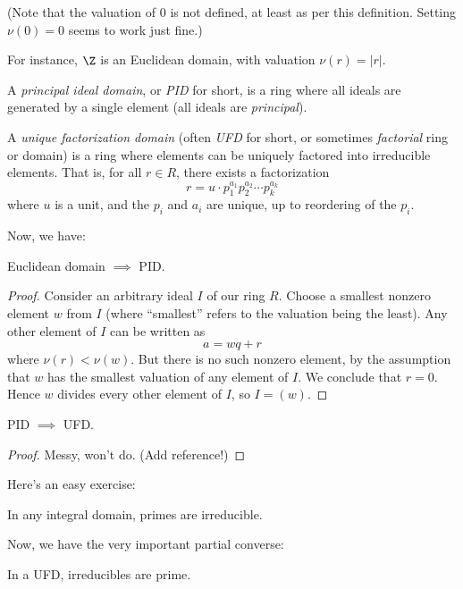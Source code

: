 \documentclass{scrbook}
\begin{document}
(Note that the valuation of $0$ is not defined, at least as per this definition.
Setting $\nu(0)=0$ seems to work just fine.)

For instance, $\Z$ is an Euclidean domain, with valuation $\nu(r) = |r|$.

\begin{defn}
 A \textit{principal ideal domain}, or \textit{PID} for short, is a ring where
 all ideals are generated by a single element (all ideals are \textit{principal}).
\end{defn}

\begin{defn}
  A \textit{unique factorization domain} (often \textit{UFD} for short, or sometimes
  \textit{factorial} ring or domain) is a ring where elements can be uniquely
  factored into irreducible elements. That is, for all $r\in R$, there exists a
  factorization
  $$r=u\cdot p_1^{a_1}p_2^{a_2}\cdots p_k^{a_k}$$
  where $u$ is a unit, and the $p_i$ and $a_i$ are unique, up to reordering of
  the $p_i$.
\end{defn}

Now, we have:
\begin{fact}
 Euclidean domain $\implies$ PID.
\end{fact}
\begin{proof}
  Consider an arbitrary ideal $I$ of our ring $R$. Choose a smallest nonzero
  element $w$ from
 $I$ (where ``smallest'' refers to the valuation being the least).
 Any other element of $I$ can be written as
 $$a = wq + r$$
 where $\nu(r) < \nu(w)$. But there is no such nonzero element, by the
 assumption that $w$ has the smallest valuation of any element of $I$. We
 conclude that $r=0$.
 Hence $w$ divides every other element of $I$, so $I=(w)$.
\end{proof}

\begin{fact}
  PID $\implies$ UFD. 
\end{fact}

\begin{proof}
 Messy, won't do. (Add reference!) 
\end{proof}

Here's an easy exercise:

\begin{exercise}
 In any integral domain, primes are irreducible. 
\end{exercise}

Now, we have the very important partial converse:

\begin{fact}
 In a UFD, irreducibles are prime. 
\end{fact}
\end{document}
